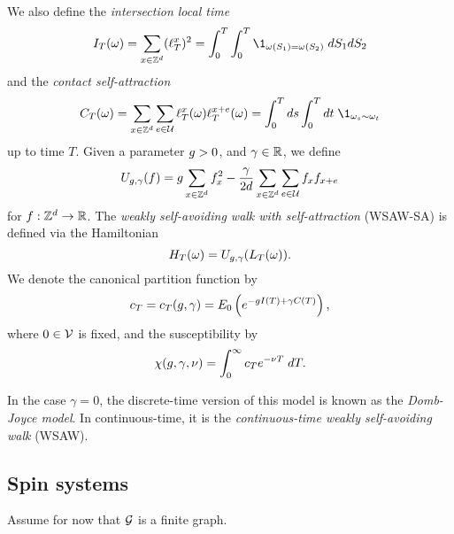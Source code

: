We also define the \emph{intersection local time}
\begin{equation}
\label{e:ITdef}
I_T(\omega) = \sum_{x\in\Zd} (\lt^x_T)^2 = \int_0^T \int_0^T \1_{\omega(S_1)=\omega(S_2)} \; dS_1 dS_2
\end{equation}
and the \emph{contact self-attraction}
\begin{equation}
\label{e:CTdef}
C_T(\omega) =
  \sum_{x \in \Z^d}\sum_{e\in\Ucal} \lt_T^x(\omega) \lt_T^{x+e}(\omega)
  = \int_0^T ds \int_0^T dt \; \1_{\omega_{s} \sim \omega_{t}}
\end{equation}
up to time $T$.
Given a parameter $g > 0$,
and $\gamma \in {\mathbb R}$, we define
\begin{equation}
\label{e:Udef-neg}
U_{g,\gamma}(f)
=
g \sum_{x\in{ {{\mathbb Z}}^d }} f_x^2
- \frac{\gamma}{2d}
\sum_{x\in{ {{\mathbb Z}}^d }} \sum_{e\in\mathcal{U}} f_x f_{x+e}
\end{equation}
for $f : { {{\mathbb Z}}^d } \rightarrow {\mathbb R}$.
The \emph{weakly self-avoiding walk with self-attraction} (WSAW-SA) is defined via
the Hamiltonian
\begin{equation}
H_T(\omega) = U_{g,\gamma}(L_T(\omega)).
\end{equation}
We denote the canonical partition function by
\begin{equation}
c_T = c_T(g, \gamma) = E_0 \left( e^{-g I(T) + \gamma C(T)} \right),
\end{equation}
where $0 \in \mathcal{V}$ is fixed, and the susceptibility by
\begin{equation}
\chi(g, \gamma, \nu) = \int_0^\infty c_T e^{-\nu T} \; dT.
\end{equation}

In the case $\gamma = 0$, the discrete-time version of this model is known as
the \emph{Domb-Joyce model}. In continuous-time, it is the \emph{continuous-time
weakly self-avoiding walk} (WSAW).


\subsection{Spin systems}

Assume for now that $\mathcal{G}$ is a finite graph.

